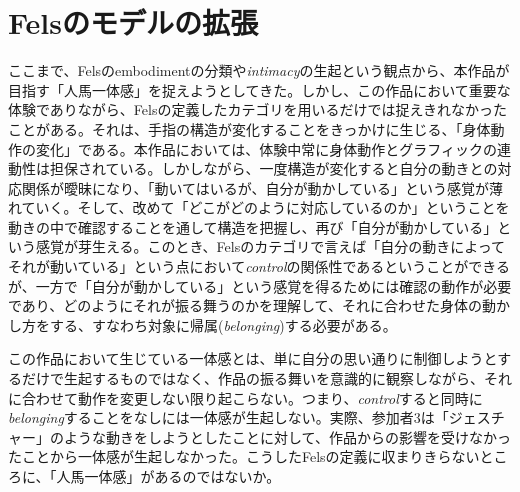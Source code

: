 
\section{Felsのモデルの拡張}
ここまで、Felsのembodimentの分類や\textit{intimacy}の生起という観点から、本作品が目指す「人馬一体感」を捉えようとしてきた。しかし、この作品において重要な体験でありながら、Felsの定義したカテゴリを用いるだけでは捉えきれなかったことがある。それは、手指の構造が変化することをきっかけに生じる、「身体動作の変化」である。本作品においては、体験中常に身体動作とグラフィックの連動性は担保されている。しかしながら、一度構造が変化すると自分の動きとの対応関係が曖昧になり、「動いてはいるが、自分が動かしている」という感覚が薄れていく。そして、改めて「どこがどのように対応しているのか」ということを動きの中で確認することを通して構造を把握し、再び「自分が動かしている」という感覚が芽生える。このとき、Felsのカテゴリで言えば「自分の動きによってそれが動いている」という点において\textit{control}の関係性であるということができるが、一方で「自分が動かしている」という感覚を得るためには確認の動作が必要であり、どのようにそれが振る舞うのかを理解して、それに合わせた身体の動かし方をする、すなわち対象に帰属(\textit{belonging})する必要がある。

この作品において生じている一体感とは、単に自分の思い通りに制御しようとするだけで生起するものではなく、作品の振る舞いを意識的に観察しながら、それに合わせて動作を変更しない限り起こらない。つまり、\textit{control}すると同時に\textit{belonging}することをなしには一体感が生起しない。実際、参加者3は「ジェスチャー」のような動きをしようとしたことに対して、作品からの影響を受けなかったことから一体感が生起しなかった。こうしたFelsの定義に収まりきらないところに、「人馬一体感」があるのではないか。



